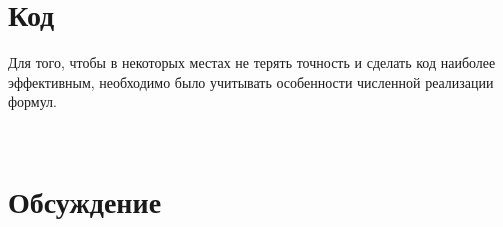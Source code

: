 \documentclass[12pt]{article}
\numberwithin{equation}{section}
\begin{document}
\section{Код} %

Для того, чтобы в некоторых местах не терять точность и сделать код наиболее эффективным, необходимо было учитывать особенности численной реализации формул. 

\begin{lstlisting}[texcl]


\end{lstlisting}


\section{Обсуждение}
\end{document}
